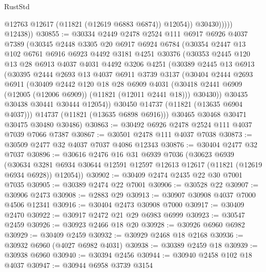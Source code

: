 \begin{lexlean}{RustStd}
\begin{coremodule}
                      @12763
                      @12617
                      (@11821 (@12619 @6883 @6874))
                      @12054))
                  @30430)))))
        @12438))
@30855 := @30334
    @2449
    @2478
    @2524
    @111
    @6917
    @6926
    @4037
    @7389
    (@30345
      @2448
      @3305
      @20
      @6917
      @6924
      @6784
      (@30354
        @2447
        @13
        @102
        @6761
        @6916
        @6923
        @4492
        @3181
        @4251
        @30376
        (@30353
          @2445
          @120
          @13
          @28
          @6913
          @4037
          @4031
          @4492
          @3206
          @4251
          (@30389
            @2445
            @13
            @6913
            (@30395
              @2444
              @2693
              @13
              @4037
              @6911
              @3739
              @3137
              (@30404
                @2444
                @2693
                @6911
                (@30409
                  @2442
                  @120
                  @18
                  @28
                  @6909
                  @4031
                  (@30418 @2441 @6909 (@12005 (@12006 @6909)) (@11821 (@12011 @2441 @18)))
                  @30430))
              @30435
              @30438
              @30441
              @30444
              @12054))
          @30450
          @14737
          (@11821 (@13635 @6904 @4037)))
        @14737
        (@11821 (@13635 @6898 @6916)))
      @30465
      @30468
      @30471
      @30475
      @30480
      @30486)
@30863 := @30492 @6926 @2478 @2524 @111 @4037 @7039 @7066 @7387
@30867 := @30501 @2478 @111 @4037 @7038
@30873 := @30509 @2477 @32 @4037 @7037 @4086 @12343
@30876 := @30404 @2477 @32 @7037
@30896 := @30616
    @2476
    @16
    @31
    @6939
    @7036
    (@30623
      @6939
      (@30634 @3281 @6934 @30644 @12591 @12597 @12613 @12617 (@11821 (@12619 @6934 @6928)) @12054))
@30902 := @30409 @2474 @2435 @22 @30 @7001 @7035
@30905 := @30389 @2474 @22 @7001
@30906 := @30528 @22
@30907 := @30906 @2473
@30908 := @2883 @29
@30913 := @30907 @30908 @4037 @7000 @4506 @12341
@30916 := @30404 @2473 @30908 @7000
@30917 := @30409 @2470
@30922 := @30917 @2472 @21 @29 @6983 @6999
@30923 := @30547 @2459
@30926 := @30923 @2466 @18 @20
@30928 := @30926 @6960 @6982
@30929 := @30409 @2459
@30932 := @30929 @2468 @18 @2168
@30936 := @30932 @6960 (@4027 @6982 @4031)
@30938 := @30389 @2459 @18
@30939 := @30938 @6960
@30940 := @30394 @2456
@30944 := @30940 @2458 @102 @18 @4037
@30947 := @30944 @6958 @3739 @3154

\end{coremodule}
\end{lexlean}
